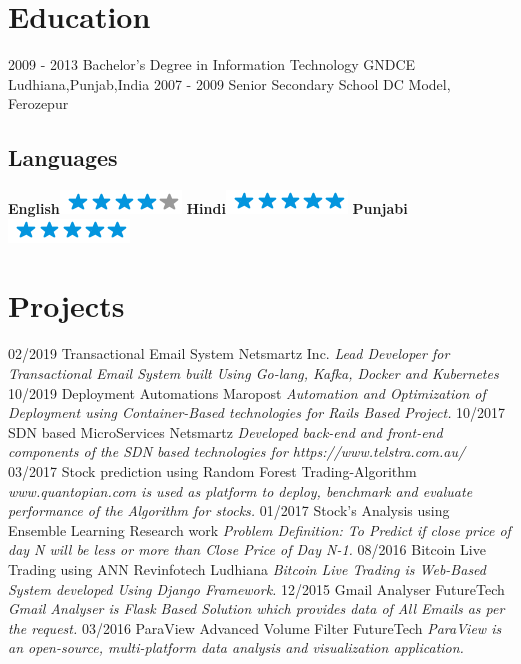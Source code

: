 \documentclass[]{friggeri-cv}
\begin{document}
\section{Education}
\begin{entrylist}
  \entry
    {2009 - 2013}
    {Bachelor's Degree in Information Technology}
    {GNDCE Ludhiana,Punjab,India}
    {\emph{}}
  \entry
    {2007 - 2009}
    {Senior Secondary School}
    {DC Model, Ferozepur}
    {\emph{}}
\end{entrylist}
\begin{aside}
   \section{Languages}
    \textbf{English}\includegraphics[scale=0.40]{img/4stars.png}
    \textbf{Hindi}\includegraphics[scale=0.40]{img/5stars.png}
    \textbf{Punjabi}\includegraphics[scale=0.40]{img/5stars.png}
\end{aside}

\section{Projects}
\begin{entrylist}
\entry
   {02/2019}
   {Transactional Email System}
   {Netsmartz Inc.}
   {\emph{Lead Developer for Transactional Email System built Using Go-lang, Kafka, Docker and Kubernetes}}
\entry
   {10/2019}
   {Deployment Automations}
   {Maropost}
   {\emph{Automation and Optimization of Deployment using Container-Based technologies for Rails Based Project.}}
\entry
   {10/2017}
   {SDN based MicroServices}
   {Netsmartz}
   {\emph{Developed back-end and front-end components of the SDN based technologies for https://www.telstra.com.au/}}
 \entry
    {03/2017}
    {Stock prediction using Random Forest}
    {Trading-Algorithm}
    {\emph{www.quantopian.com is used as platform to deploy, benchmark and evaluate performance of the Algorithm for
    stocks.}}
 \entry
    {01/2017}
    {Stock's Analysis using Ensemble Learning}
    {Research work}
    {\emph{Problem Definition: To Predict if close price of day N will be less or more than Close Price of Day N-1.}}
 \entry
    {08/2016}
    {Bitcoin Live Trading using ANN}
    {Revinfotech Ludhiana}
    {\emph{Bitcoin Live Trading is Web-Based System developed Using Django
    Framework.}}
  \entry
    {12/2015}
    {Gmail Analyser}
    {FutureTech}
    {\emph{Gmail Analyser is Flask Based Solution which provides data of All Emails
as per the request.}}
  \entry
    {03/2016}
    {ParaView Advanced Volume Filter}
    {FutureTech}
    {\emph{ParaView is an open-source, multi-platform data analysis and visualization
application.}}
\end{entrylist}
\end{document}
